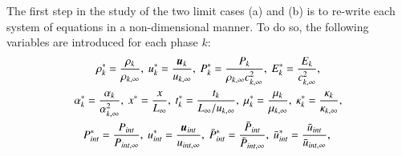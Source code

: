 \documentclass[preprint,10pt]{elsarticle}
\begin{document}
%
The first step in the study of the two limit cases (a) and (b) is to re-write each system of equations in a non-dimensional manner. To do so, the following variables are introduced for each phase $k$:
%
\begin{multline}
\label{eq:norm_param}
\rho_k^*   = \frac{\rho_k}{\rho_{k,\infty}}           ,\
u_k^*      = \frac{\boldsymbol u_k}{u_{k,\infty}}                 ,\
P_k^*      = \frac{P_k}{\rho_{k,\infty} c^2_{k,\infty}}   ,\
E_k^*      = \frac{E_k}{c^2_{k,\infty} }              , \\
\alpha_k^*      = \frac{\alpha_k}{\alpha^2_{k,\infty} }              , \
x^* = \frac{x}{L_\infty}                      ,\
t_k^* = \frac{t_k}{L_\infty / u_{k,\infty}}           ,\
\mu_k^*    = \frac{\mu_k}{\mu_{k,\infty}}             ,\
\kappa_k^* = \frac{\kappa_k}{\kappa_{k,\infty}}       ,\\
P_{int}^*    = \frac{P_{int}}{P_{int,\infty}}             ,\
u_{int}^* = \frac{\boldsymbol u_{int}}{u_{int,\infty}}       ,\
\bar{P}_{int}^*    = \frac{\bar{P}_{int}}{\bar{P}_{int,\infty}}             ,\
\bar{u}_{int}^* = \frac{\bar{u}_{int}}{\bar{u}_{int,\infty}}       ,\
\end{multline}
%
\end{document}
